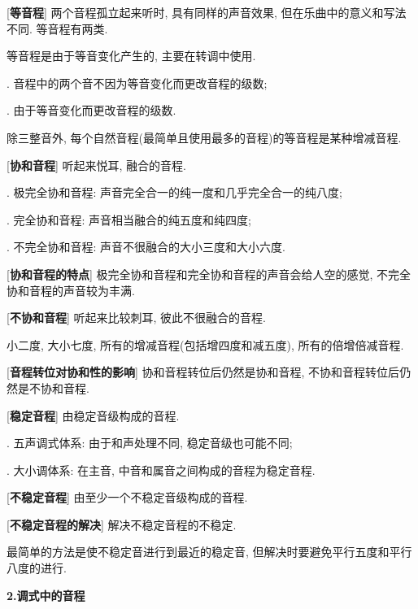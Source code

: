 \clearpage

[\textbf{等音程}] 两个音程孤立起来听时, 具有同样的声音效果, 但在乐曲中的意义和写法不同. 等音程有两类.\par
\qquad 等音程是由于等音变化产生的, 主要在转调中使用.\par
{}. 音程中的两个音不因为等音变化而更改音程的级数;\par
{}. 由于等音变化而更改音程的级数.\par
\qquad 除三整音外, 每个自然音程(最简单且使用最多的音程)的等音程是某种增减音程.\par

[\textbf{协和音程}] 听起来悦耳, 融合的音程.\par
{}. 极完全协和音程: 声音完全合一的纯一度和几乎完全合一的纯八度;\par
{}. 完全协和音程: 声音相当融合的纯五度和纯四度;\par
{}. 不完全协和音程: 声音不很融合的大小三度和大小六度.\par

[\textbf{协和音程的特点}] 极完全协和音程和完全协和音程的声音会给人空的感觉, 不完全协和音程的声音较为丰满.\par

[\textbf{不协和音程}] 听起来比较刺耳, 彼此不很融合的音程.\par
\qquad 小二度, 大小七度, 所有的增减音程(包括增四度和减五度), 所有的倍增倍减音程.\par

[\textbf{音程转位对协和性的影响}] 协和音程转位后仍然是协和音程, 不协和音程转位后仍然是不协和音程.\par

[\textbf{稳定音程}] 由稳定音级构成的音程.\par
{}. 五声调式体系: 由于和声处理不同, 稳定音级也可能不同;\par
{}. 大小调体系: 在主音, 中音和属音之间构成的音程为稳定音程.\par

[\textbf{不稳定音程}] 由至少一个不稳定音级构成的音程.\par

[\textbf{不稳定音程的解决}] 解决不稳定音程的不稳定. \par
\qquad 最简单的方法是使不稳定音进行到最近的稳定音, 但解决时要避免平行五度和平行八度的进行.\par

\clearpage

\begin{center}
 \textbf{2.调式中的音程}\\
\end{center}


